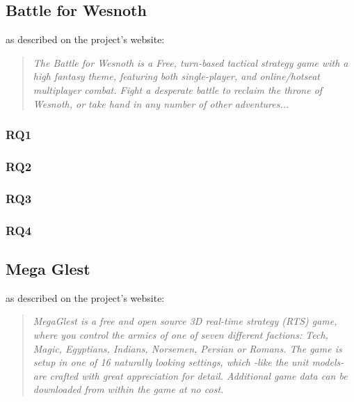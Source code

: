 \subsection{Battle for Wesnoth}
\BOW{} as described on the project's website:
\begin{quote}
\textit{The Battle for Wesnoth is a Free, turn-based tactical strategy game with a high fantasy theme, featuring both
single-player, and online/hotseat multiplayer combat. Fight a desperate battle to reclaim the throne of Wesnoth, or take
hand in any number of other adventures... }
\end{quote}

\subsubsection{RQ1}
\subsubsection{RQ2}
\subsubsection{RQ3}
\subsubsection{RQ4}

\subsection{Mega Glest}
\GLEST{} as described on the project's website:
\begin{quote}
\textit{MegaGlest is a free and open source 3D real-time strategy (RTS) game, where you control the armies of one of
seven different factions: Tech, Magic, Egyptians, Indians, Norsemen, Persian or Romans. The game is setup in one of 16
naturally looking settings, which -like the unit models- are crafted with great appreciation for detail. Additional game
data can be downloaded from within the game at no cost.}
\end{quote}

